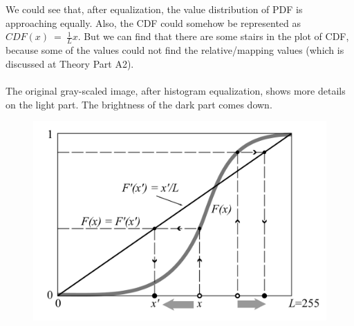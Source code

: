 \documentclass{article}
\begin{document}
\begin{enumerate}[label=B\arabic*)]
		\\
		\\
		We could see that, after equalization, the value distribution of PDF is approaching equally. Also, the CDF could somehow be represented as $CDF(x)\:=\:\frac{1}{L}x$. But we can find that there are some stairs in the plot of CDF, because some of the values could not find the relative/mapping values (which is discussed at Theory Part A2). 
		\\
		\\
		The original gray-scaled image, after histogram equalization, shows more details on the light part. The brightness of the dark part comes down.
		\begin{figure}[h!]
			\centering
			\includegraphics[width=0.7\linewidth]{img-6.png}
		\end{figure}


\end{enumerate}
\end{document}
